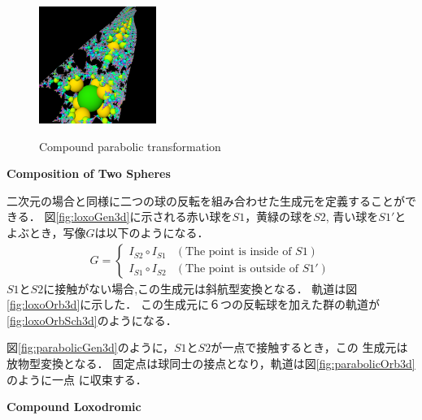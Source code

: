 \begin{figure}[h!tbp]
\begin{minipage}{0.49\hsize}
  \begin{minipage}{0.24\hsize}
   \center
   \includegraphics[width=1.5in, height=1.5in, keepaspectratio]{../img/klein/3diis/compParabolicOrb.pdf}
   \label{fig:compParabolicOrb}
  \end{minipage}
  \hspace*{\fill}
  \caption{Compound parabolic transformation}
  \label{fig:compParabolic}
 \end{minipage}
\end{figure}

\noindent\textbf{Composition of Two Spheres}

二次元の場合と同様に二つの球の反転を組み合わせた生成元を定義することができる．
図\ref{fig:loxoGen3d}に示される赤い球を$S1$，黄緑の球を$S2$,
青い球を$S1'$とよぶとき，写像$G$は以下のようになる．
\begin{align*}
G =
\begin{cases}
 I_{S2} \circ I_{S1} & (\text{The point is inside of } S1) \\
 I_{S1} \circ I_{S2} & (\text{The point is outside of }S1')
\end{cases}
\end{align*}
$S1$と$S2$に接触がない場合,この生成元は斜航型変換となる．
軌道は図\ref{fig:loxoOrb3d}に示した．
この生成元に６つの反転球を加えた群の軌道が\ref{fig:loxoOrbSch3d}のようになる．

図\ref{fig:parabolicGen3d}のように，$S1$と$S2$が一点で接触するとき，この
生成元は放物型変換となる．
固定点は球同士の接点となり，軌道は図\ref{fig:parabolicOrb3d}のように一点
に収束する．

\noindent\textbf{Compound Loxodromic}

